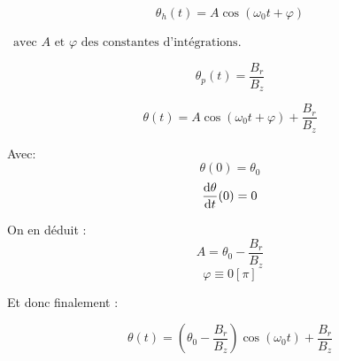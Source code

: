 \documentclass{report}
\begin{document}
$$\theta_h(t) = A \cos(\omega_0 t + \varphi)$$

$\, \text{ avec } A \text{ et } \varphi \text{ des constantes d'intégrations}$.

\newpage
{}

$$\theta_p(t) = \frac{B_r}{B_z}$$



$$\theta(t) = A \cos(\omega_0 t + \varphi) + \frac{B_r}{B_z}$$


Avec:
$$\theta(0) = \theta_0$$
$$\frac{\mathrm{d}\theta}{\mathrm{d}t} (0) = 0$$

On en déduit : 
$$A = \theta_0  - \frac{B_r}{B_z}$$
$$\varphi \equiv 0 \left[\pi\right] $$ 

Et donc finalement :

\begin{prettybox}[blue]
    $$\theta(t) = \left(\theta_0  - \frac{B_r}{B_z}\right) \cos(\omega_0 t) + \frac{B_r}{B_z}$$
\end{prettybox}
\end{document}
